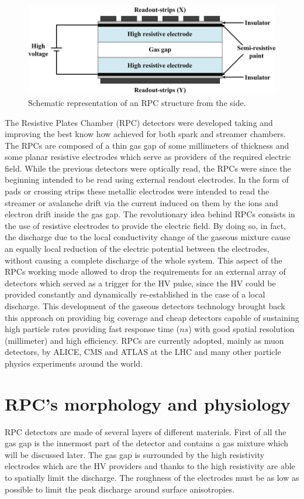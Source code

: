 \begin{figure}[!t]
\begin{center}
\includegraphics[width=0.8\linewidth]{Chapters/Performance/Figs/RPCside.png}
\caption{Schematic representation of an RPC structure from the side.}
\label{fig:RPCside}
\end{center}
\end{figure}

The Resistive Plates Chamber (RPC) detectors were developed taking and improving the best know how achieved for both spark and streamer chambers.
The RPCs are composed of a thin gas gap of some millimeters of thickness and some planar resistive electrodes which serve as providers of the required electric field.
While the previous detectors were optically read, the RPCs were since the beginning intended to be read using external readout electrodes.
In the form of pads or crossing strips these metallic electrodes were intended to read the streamer or avalanche drift via the current induced on them by the ions and electron drift inside the gas gap.
The revolutionary idea behind RPCs consists in the use of resistive electrodes to provide the electric field.
By doing so, in fact, the discharge due to the local conductivity change of the gaseous mixture cause an equally local reduction of the electric potential between the electrodes, without causing a complete discharge of the whole system.
This aspect of the RPCs working mode allowed to drop the requirements for an external array of detectors which served as a trigger for the HV pulse, since the HV could be provided constantly and dynamically re-established in the case of a local discharge.
This development of the gaseous detectors technology brought back this approach on providing big coverage and cheap detectors capable of sustaining high particle rates providing fast response time ($ns$) with good spatial resolution (millimeter) and high efficiency.
RPCs are currently adopted, mainly as muon detectors, by ALICE, CMS and ATLAS at the LHC and many other particle physics experiments around the world.

\section{RPC's morphology and physiology}
RPC detectors are made of several layers of different materials.
First of all the gas gap is the innermost part of the detector and contains a gas mixture which will be discussed later.
The gas gap is surrounded by the high resistivity electrodes which are the HV providers and thanks to the high resistivity are able to spatially limit the discharge.
The roughness of the electrodes must be as low as possible to limit the peak discharge around surface anisotropies.


